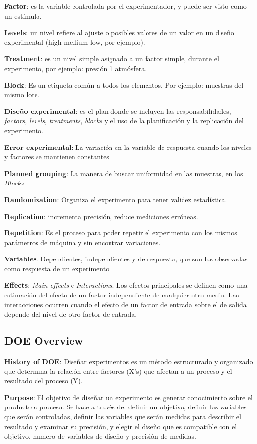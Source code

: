\documentclass[oneside]{book}
\begin{document}
\textbf{Factor}: es la variable controlada por el experimentador, y puede ser visto como un estímulo.

\textbf{Levels}: un nivel refiere al ajuste o posibles valores de un valor en un diseño experimental (high-medium-low, por ejemplo).

\textbf{Treatment}: es un nivel simple asignado a un factor simple, durante el experimento, por ejemplo: presión 1 atmósfera.

\textbf{Block}: Es un etiqueta común a todos los elementos. Por ejemplo: muestras del mismo lote.

\textbf{Diseño experimental}: es el plan donde se incluyen las responsabilidades, \textit{factors}, \textit{levels}, \textit{treatments}, \textit{blocks} y el uso de la planificación y la replicación del experimento.

\textbf{Error experimental}: La variación en la variable de respuesta cuando los niveles y factores se mantienen constantes.

\textbf{Planned grouping}: La manera de buscar uniformidad en las muestras, en los \textit{Blocks}.

\textbf{Randomization}: Organiza el experimento para tener validez estadística.

\textbf{Replication}: incrementa precisión, reduce mediciones erróneas.

\textbf{Repetition}: Es el proceso para poder repetir el experimento con los mismos parámetros de máquina y sin encontrar variaciones.

\textbf{Variables}: Dependientes, independientes y de respuesta, que son las observadas como respuesta de un experimento.

\textbf{Effects}: \textit{Main effects} e \textit{Interactions}. Los efectos principales se definen como una estimación del efecto de un factor independiente de cualquier otro medio. Las interacciones ocurren cuando el efecto de un factor de entrada sobre el de salida depende del nivel de otro factor de entrada.

\subsection{DOE Overview}

\textbf{History of DOE}: Diseñar experimentos es un método estructurado y organizado que determina la relación entre factores (X's) que afectan a un proceso y el resultado del proceso (Y).

\textbf{Purpose}: El objetivo de diseñar un experimento es generar conocimiento sobre el producto o proceso. Se hace a través de: definir un objetivo, definir las variables que serán controladas, definir las variables que serán medidas para describir el resultado y examinar su precisión, y elegir el diseño que es compatible con el objetivo, numero de variables de diseño y precisión de medidas.
\end{document}

